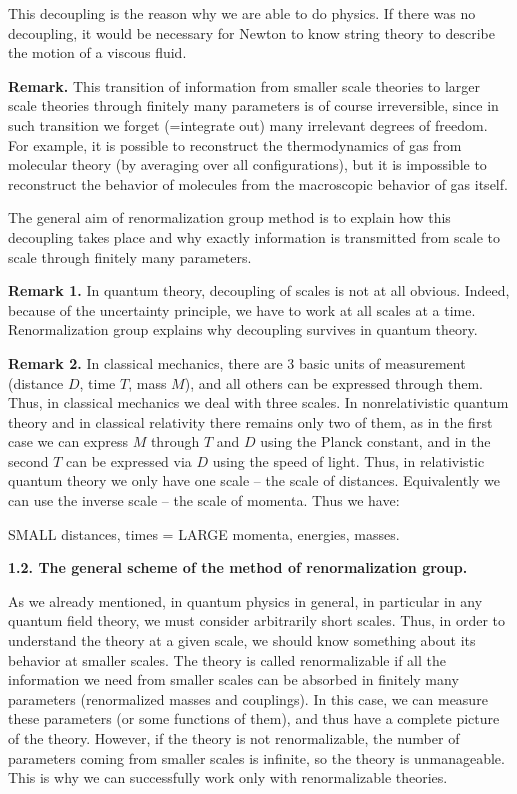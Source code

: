 This decoupling is the reason why we are able to do physics. If 
there was no decoupling, it would be necessary for Newton to 
know string theory to describe the motion of a viscous fluid. 

{\bf Remark.} This transition of information 
from smaller scale theories 
to larger scale theories through finitely many parameters 
is of course irreversible, since in such transition we forget 
(=integrate out) 
many irrelevant degrees of freedom. For example, it is possible 
to reconstruct the thermodynamics of gas from molecular theory
(by averaging over all configurations), but it is impossible to
reconstruct the behavior of molecules from the macroscopic behavior
of gas itself. 

The general aim of renormalization group method is to explain how 
this decoupling takes place and why exactly information 
is transmitted from scale to scale through finitely many parameters.

{\bf Remark 1.} In quantum theory, decoupling of scales is not at all
obvious. Indeed, because of the uncertainty principle, we have to work
at all scales at a time. Renormalization group explains why 
decoupling survives in quantum theory. 

{\bf Remark 2.} In classical mechanics, there are 3 basic units 
of measurement (distance $D$, time $T$, mass $M$), and all others can be 
expressed through them. Thus, in classical mechanics
we deal with three scales. In nonrelativistic quantum theory
and in classical relativity there remains only two of them, as in the first
case we can express $M$ through $T$ and $D$ using the Planck constant, and
in the second $T$ can be expressed via $D$ using the speed of light. 
Thus, in relativistic quantum theory we only have one 
scale -- the scale of distances. 
Equivalently we can use the inverse scale -- the scale 
of momenta. Thus we have:

SMALL distances, times = LARGE momenta, energies, masses.

{\bf 1.2. The general scheme of the method
of renormalization group.}

As we already mentioned,
in quantum physics in general, in particular in any quantum field theory,
we must consider arbitrarily short scales. Thus, in order to understand
the theory at a given scale, we should know something about its behavior
at smaller scales. The theory is called renormalizable if all the
information we need from smaller scales can be absorbed in finitely many
parameters (renormalized masses and couplings). In this case, we can
measure these parameters (or some functions of them), and thus have a 
complete picture of the theory. However, if the theory is not
renormalizable, the number of parameters coming from smaller scales 
is infinite, so the theory is unmanageable. This is why we can 
successfully work only with renormalizable theories. 

